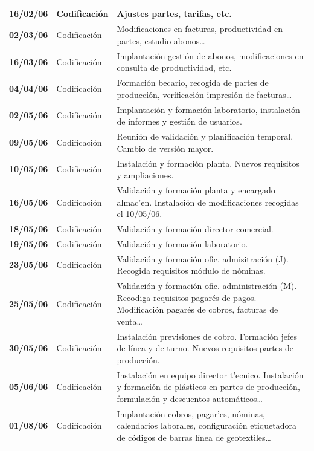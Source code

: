 \documentclass[a4paper]{article}
\begin{document}
\begin{center}
\begin{longtable}{|| c | l | p{} ||}
                \hline
                \textbf{16/02/06} & Codificación & Ajustes partes, tarifas, etc. \\
                \hline
                \textbf{02/03/06} & Codificación & Modificaciones en facturas, productividad en partes, estudio abonos\dots\\
                \hline
                \textbf{16/03/06} & Codificación & Implantación gestión de abonos, modificaciones en consulta de productividad, etc. \\
                \hline
                \textbf{04/04/06} & Codificación & Formación becario, recogida de partes de producción, verificación impresión de facturas\dots \\
                \hline
                \textbf{02/05/06} & Codificación & Implantación y formación laboratorio, instalación de informes y gestión de usuarios. \\
                \hline
                \textbf{09/05/06} & Codificación & Reunión de validación y planificación temporal. Cambio de versión mayor. \\
                \hline
                \textbf{10/05/06} & Codificación & Instalación y formación planta. Nuevos requisitos y ampliaciones. \\
                \hline
                \textbf{16/05/06} & Codificación & Validación y formación planta y encargado almac'en. Instalación de modificaciones recogidas el 10/05/06. \\
                \hline
                \textbf{18/05/06} & Codificación & Validación y formación director comercial. \\
                \hline
                \textbf{19/05/06} & Codificación & Validación y formación laboratorio. \\
                \hline
                \textbf{23/05/06} & Codificación & Validación y formación ofic. admisitración (J). Recogida requisitos módulo de nóminas. \\
                \hline
                \textbf{25/05/06} & Codificación & Validación y formación ofic. administración (M). Recodiga requisitos pagarés de pagos. Modificación pagarés de cobros, facturas de venta\dots \\
                \hline
                \textbf{30/05/06} & Codificación & Instalación previsiones de cobro. Formación jefes de línea y de turno. Nuevos requisitos partes de producción. \\
                \hline
                \textbf{05/06/06} & Codificación & Instalación en equipo director t'ecnico. Instalación y formación de plásticos en partes de producción, formulación y descuentos automáticos\dots \\
                \hline
                \textbf{01/08/06} & Codificación & Implantación cobros, pagar'es, nóminas, calendarios laborales, configuración etiquetadora de códigos de barras línea de geotextiles\dots \\
                \hline
                \hline
            \end{longtable}
        \end{center}
\end{document}
